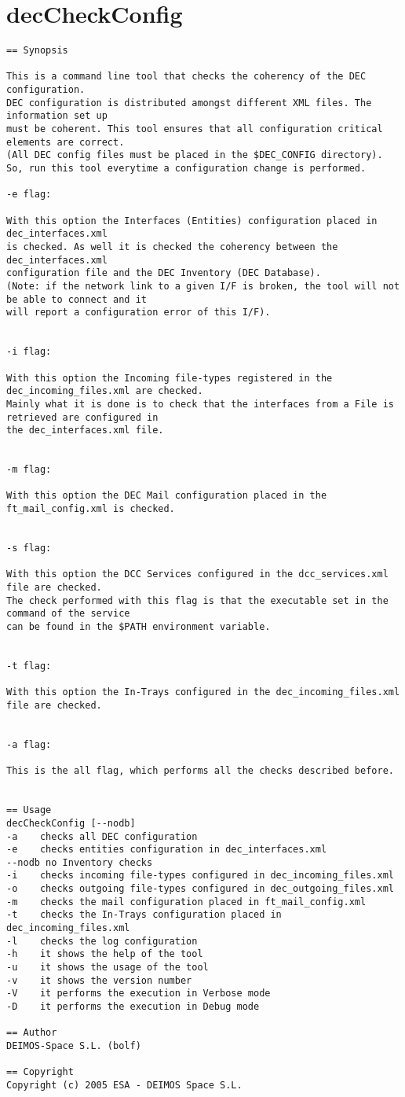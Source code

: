 \documentclass[dec_sum_main.tex]{subfiles}
\begin{document}
\label{decCheckConfig}
\section{decCheckConfig}
 
\begin{verbatim}
== Synopsis

This is a command line tool that checks the coherency of the DEC configuration.
DEC configuration is distributed amongst different XML files. The information set up
must be coherent. This tool ensures that all configuration critical elements are correct.
(All DEC config files must be placed in the $DEC_CONFIG directory). 
So, run this tool everytime a configuration change is performed.

-e flag:

With this option the Interfaces (Entities) configuration placed in dec_interfaces.xml
is checked. As well it is checked the coherency between the dec_interfaces.xml
configuration file and the DEC Inventory (DEC Database).
(Note: if the network link to a given I/F is broken, the tool will not be able to connect and it
will report a configuration error of this I/F).


-i flag:

With this option the Incoming file-types registered in the dec_incoming_files.xml are checked.
Mainly what it is done is to check that the interfaces from a File is retrieved are configured in 
the dec_interfaces.xml file.


-m flag:

With this option the DEC Mail configuration placed in the ft_mail_config.xml is checked.


-s flag:

With this option the DCC Services configured in the dcc_services.xml file are checked.
The check performed with this flag is that the executable set in the command of the service
can be found in the $PATH environment variable.


-t flag:

With this option the In-Trays configured in the dec_incoming_files.xml file are checked.


-a flag:

This is the all flag, which performs all the checks described before.


== Usage
decCheckConfig [--nodb]
-a    checks all DEC configuration
-e    checks entities configuration in dec_interfaces.xml
--nodb no Inventory checks
-i    checks incoming file-types configured in dec_incoming_files.xml
-o    checks outgoing file-types configured in dec_outgoing_files.xml
-m    checks the mail configuration placed in ft_mail_config.xml
-t    checks the In-Trays configuration placed in dec_incoming_files.xml
-l    checks the log configuration
-h    it shows the help of the tool
-u    it shows the usage of the tool
-v    it shows the version number
-V    it performs the execution in Verbose mode
-D    it performs the execution in Debug mode     

== Author
DEIMOS-Space S.L. (bolf)

== Copyright
Copyright (c) 2005 ESA - DEIMOS Space S.L.

\end{verbatim}
\end{document}
